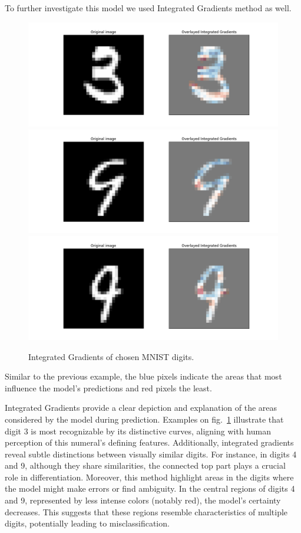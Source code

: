 \documentclass[journal, a4paper]{IEEEtran}
\begin{document}
To further investigate this model we used Integrated Gradients method as well.
\begin{figure}[h]\centering
    \includegraphics[width=.6\linewidth]{img/integrated_grad/mnist_CNN/3}
    \includegraphics[width=.6\linewidth]{img/integrated_grad/mnist_CNN/4}
    \includegraphics[width=.6\linewidth]{img/integrated_grad/mnist_CNN/9}
    \caption{Integrated Gradients of chosen MNIST digits.}\label{fig:mnist-cnn-integrated-grad}
\end{figure}
Similar to the previous example, the blue pixels indicate the areas that most influence the model's predictions and red pixels the least.

Integrated Gradients provide a clear depiction and explanation of the areas considered by the model during prediction.
Examples on fig.~\ref{fig:mnist-cnn-integrated-grad} illustrate that digit 3 is most recognizable by its distinctive curves, aligning with human perception of this numeral's defining features.
Additionally, integrated gradients reveal subtle distinctions between visually similar digits.
For instance, in digits 4 and 9, although they share similarities, the connected top part plays a crucial role in differentiation.
Moreover, this method highlight areas in the digits where the model might make errors or find ambiguity.
In the central regions of digits 4 and 9, represented by less intense colors (notably red), the model's certainty decreases.
This suggests that these regions resemble characteristics of multiple digits, potentially leading to misclassification.
\end{document}
